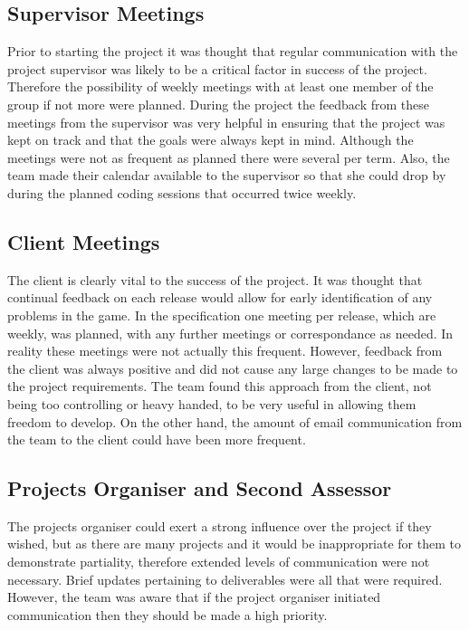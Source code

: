 \subsection{Supervisor Meetings}

Prior to starting the project it was thought that regular communication with the project
supervisor was likely to be a critical factor in success of the project. Therefore the
possibility of weekly meetings with at least one member of the group if not more were
planned. During the project the feedback from these meetings from the supervisor was very
helpful in ensuring that the project was kept on track and that the goals were always
kept in mind. Although the meetings were not as frequent as planned there were several
per term. Also, the team made their calendar available to the supervisor so that she
could drop by during the planned coding sessions that occurred twice weekly.

\subsection{Client Meetings}

The client is clearly vital to the success of the project. It was thought that continual
feedback on each release would allow for early identification of any problems in the game.
In the specification one meeting per release, which are weekly, was planned, with any
further meetings or correspondance as needed. In reality these meetings were not actually this
frequent. However, feedback from the client was always positive and did not cause any
large changes to be made to the project requirements. The team found this approach from
the client, not being too controlling or heavy handed, to be very useful in allowing them
freedom to develop. On the other hand, the amount of email communication from the team to
the client could have been more frequent.

\subsection{Projects Organiser and Second Assessor}

The projects organiser could exert a strong influence over the project if they wished,
but as there are many projects and it would be inappropriate for them to demonstrate
partiality, therefore extended levels of communication were not necessary. Brief updates
pertaining to deliverables were all that were required. However, the team was aware that
if the project organiser initiated communication then they should be made a high priority.

